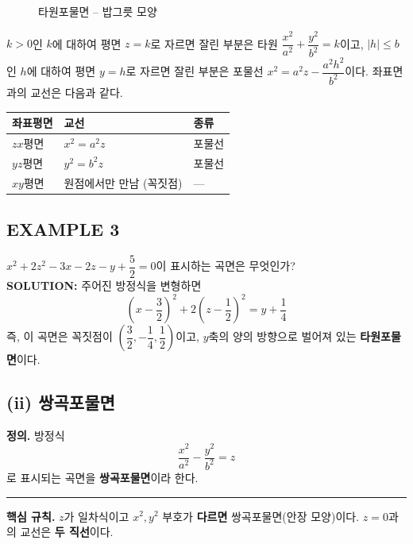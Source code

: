 \documentclass{article}
\theoremstyle{mystyle}
\begin{document}
\begin{figure}[h]
\centering
{}
\caption{타원포물면 -- 밥그릇 모양}
\end{figure}

\(k>0\)인 \(k\)에 대하여 평면 \(z=k\)로 자르면 잘린 부분은 타원 \(\dfrac{x^2}{a^2}+\dfrac{y^2}{b^2}=k\)이고, \(|h|\le b\)인 \(h\)에 대하여 평면 \(y=h\)로 자르면 잘린 부분은 포물선 \(x^2=a^2z-\dfrac{a^2h^2}{b^2}\)이다. 좌표면과의 교선은 다음과 같다.

\begin{center}
\renewcommand{\arraystretch}{1.4}
\begin{tabular}{|l|l|l|}
\hline
좌표평면 & 교선 & 종류 \\
\hline
\(zx\)평면 & \(x^2=a^2z\) & 포물선 \\
\hline
\(yz\)평면 & \(y^2=b^2z\) & 포물선 \\
\hline
\(xy\)평면 & 원점에서만 만남 (꼭짓점) & --- \\
\hline
\end{tabular}
\end{center}

\subsection*{EXAMPLE 3}
\(x^2+2z^2-3x-2z-y+\dfrac{5}{2}=0\)이 표시하는 곡면은 무엇인가?\\
\textbf{SOLUTION:} 주어진 방정식을 변형하면
\[
\left(x-\frac{3}{2}\right)^2+2\left(z-\frac{1}{2}\right)^2=y+\frac{1}{4}
\]
즉, 이 곡면은 꼭짓점이 \(\left(\dfrac{3}{2},-\dfrac{1}{4},\dfrac{1}{2}\right)\)이고, \(y\)축의 양의 방향으로 벌어져 있는 \textbf{타원포물면}이다.

\subsection*{(ii) 쌍곡포물면}

\begin{tcolorbox}[
    colback=teal!4,
    colframe=teal!65!black,
    title=정의 \& 핵심 규칙,
    fonttitle=\bfseries,
    boxrule=0.5mm,
    arc=3mm
    ]
    \textbf{\textcolor{teal!65!black}{정의.}}\quad
    방정식
    \[
    \frac{x^2}{a^2}-\frac{y^2}{b^2}=z
    \]
    로 표시되는 곡면을 \textbf{쌍곡포물면}이라 한다.

    \noindent\textcolor{teal!50!black}{\rule{\linewidth}{0.4pt}}

    \textbf{\textcolor{teal!65!black}{핵심 규칙.}}\quad
    \(z\)가 일차식이고 \(x^2,y^2\) 부호가 \textbf{다르면} 쌍곡포물면(안장 모양)이다. \(z=0\)과의 교선은 \textbf{두 직선}이다.
\end{tcolorbox}
\end{document}
